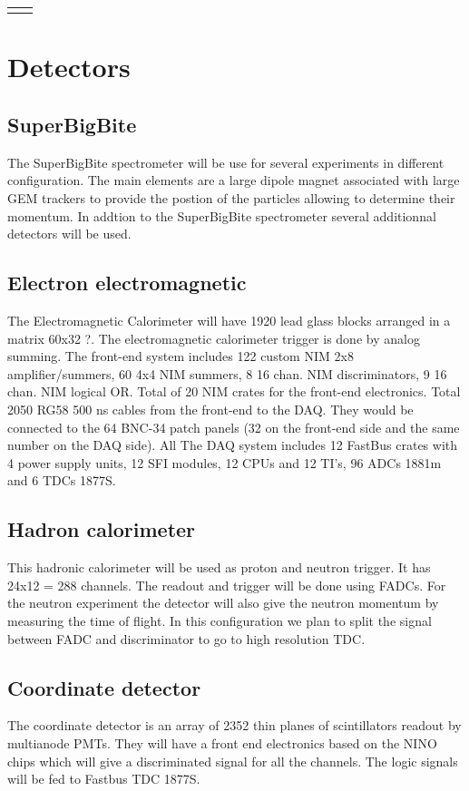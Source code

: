\documentclass{article}
\begin{document}
\begin{tabular}{|c|c|}
\hline
&\\
\hline
&\\
\hline
\end{tabular}




\section{Detectors}
\subsection{SuperBigBite}
The SuperBigBite spectrometer will be use for several experiments in different configuration. The main elements are a large dipole magnet associated with large GEM trackers to provide the postion of the particles allowing to determine their momentum.
In addtion to the SuperBigBite spectrometer several additionnal detectors will be used.
\subsection{Electron electromagnetic}
The Electromagnetic Calorimeter will have 1920 lead glass blocks arranged in a matrix 60x32 ?. The electromagnetic calorimeter trigger is done by analog summing. 
The front-end system includes 122 custom NIM 2x8 amplifier/summers, 60
4x4 NIM summers, 8 16 chan. NIM discriminators, 9 16 chan. NIM logical OR.
Total of 20 NIM crates for the front-end electronics. Total 2050 RG58 500 ns
cables from the front-end to the DAQ. They would be connected to the 64
BNC-34 patch panels (32 on the front-end side and the same number on the
DAQ side). 
All
The DAQ system includes 12 FastBus crates with 4 power supply units, 12 SFI
modules, 12 CPUs and 12 TI’s, 96 ADCs 1881m and 6 TDCs 1877S.
\subsection{Hadron calorimeter}
This hadronic calorimeter will be used as proton and neutron trigger.
It has 24x12 = 288 channels. The readout and trigger will be done using FADCs.
For the neutron experiment the detector will also give the neutron momentum by measuring the time of flight. In this configuration we plan to split the signal between FADC and discriminator to go to high resolution TDC.
\subsection{Coordinate detector}
The coordinate detector is an array of 2352 thin planes of scintillators readout by multianode PMTs. They will have a front end electronics based on the NINO chips which will give a discriminated signal for all the channels. The logic signals will be fed to Fastbus TDC 1877S. 
\end{document}
